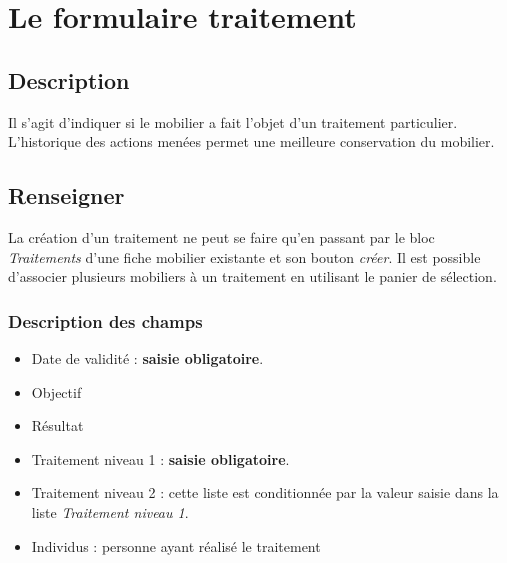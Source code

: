 \documentclass[letterpaper,10pt,french]{sphinxmanual}
\begin{document}
\chapter{Le formulaire traitement}
\label{manuel/formulaire_traitement:le-formulaire-traitement}\label{manuel/formulaire_traitement::doc}

\section{Description}
\label{manuel/formulaire_traitement:description}
Il s'agit d'indiquer si le mobilier a fait l’objet d’un traitement particulier. L'historique des actions menées permet une meilleure conservation du mobilier.
\begin{figure}[htbp]
\centering

\end{figure}


\section{Renseigner}
\label{manuel/formulaire_traitement:renseigner}
La création d'un traitement ne peut se faire qu'en passant par le bloc \emph{Traitements} d'une fiche mobilier existante et son bouton \emph{créer}. Il est possible d'associer plusieurs mobiliers à un traitement en utilisant le panier de sélection.


\subsection{Description des champs}
\label{manuel/formulaire_traitement:description-des-champs}\begin{itemize}
\item {} 
Date de validité : \textbf{saisie obligatoire}.

\item {} 
Objectif

\item {} 
Résultat

\item {} 
Traitement niveau 1 : \textbf{saisie obligatoire}.

\item {} 
Traitement niveau 2 : cette liste est conditionnée par la valeur saisie dans la liste \emph{Traitement niveau 1}.

\item {} 
Individus : personne ayant réalisé le traitement

\end{itemize}
\end{document}
